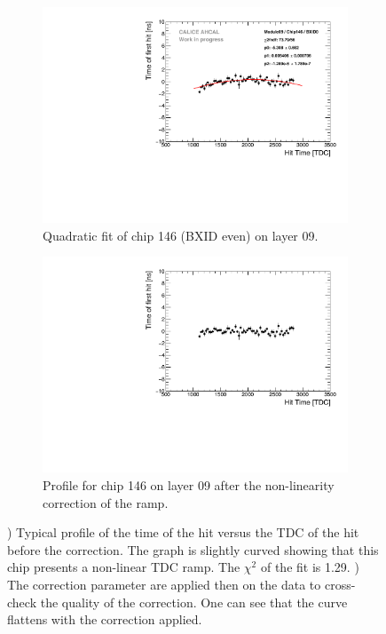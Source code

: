 \begin{figure}[htbp!]
	\begin{subfigure}[t]{0.5\textwidth}
		\centering
		\includegraphics[width=1\textwidth]{chap5/fig_AHCAL_timing/Muons/LinearityCorrection_Module09_Chip146_BXID0.pdf}
		\caption{Quadratic fit of chip 146 (BXID even) on layer 09.}\label{fig:LinCorr}
	\end{subfigure}
	\hfill
	\begin{subfigure}[t]{0.5\textwidth}
		\centering
		\includegraphics[width=1\textwidth]{chap5/fig_AHCAL_timing/Muons/LinearityCorrection_Module09_Chip146_BXID0_Corrected.pdf}
		\caption{Profile for chip 146 on layer 09 after the non-linearity correction of the ramp.}\label{fig:LinCorr_2}
	\end{subfigure}
	\caption{) Typical profile of the time of the hit versus the TDC of the hit before the correction. The graph is slightly curved showing that this chip presents a non-linear TDC ramp. The $\chi^2$ of the fit is 1.29. ) The correction parameter are applied then on the data to cross-check the quality of the correction. One can see that the curve flattens with the correction applied.}
\end{figure}

